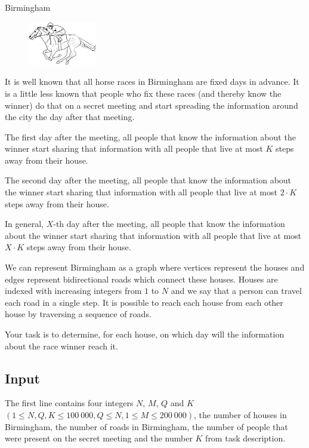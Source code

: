 \begin{statement}[
  problempoints=70,
  timelimit=1 second,
  memorylimit=512 MiB,
]{Birmingham}

\setlength\intextsep{-0.1cm}
\begin{figure}
\centering
\includegraphics[width=0.27\textwidth]{img/birmingham.png}
\end{figure}

It is well known that all horse races in Birmingham are fixed days in advance.
It is a little less known that people who fix these races (and thereby
know the winner) do that on a secret meeting and start spreading the
information around the city the day after that meeting.

The first day after the meeting, all people that know the information about the
winner start sharing that information with all people that live at most $K$
steps away from their house.

The second day after the meeting, all people that know the information about
the winner start sharing that information with all people that live at most
$2 \cdot K$ steps away from their house.

In general, $X$-th day after the meeting, all people that know the information
about the winner start sharing that information with all people that live at
most $X \cdot K$ steps away from their house.

We can represent Birmingham as a graph where vertices represent the houses and
edges represent bidirectional roads which connect these houses. Houses are
indexed with increasing integers from $1$ to $N$ and we say that a person
can travel each road in a single step. It is possible to reach each house
from each other house by traversing a sequence of roads.

Your task is to determine, for each house, on which day will the information
about the race winner reach it.

\subsection*{Input}
The first line contains four integers $N$, $M$, $Q$ and $K$ $(1 \le N, Q, K \le
100\ 000, Q \le N, 1 \le M \le 200\ 000)$, the number of houses in
Birmingham, the number of roads in Birmingham, the number of people that were
present on the secret meeting and the number $K$ from task description.


\end{statement}
